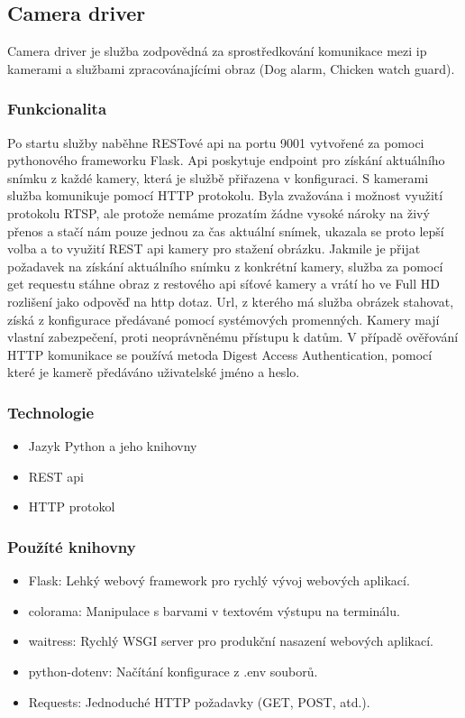 

\subsection{Camera driver}\label{subsec:camera-driver}
Camera driver je služba zodpovědná za sprostředkování komunikace mezi ip kamerami a službami zpracovánajícími obraz (Dog alarm, Chicken watch guard).\newline

\subsubsection{Funkcionalita}
Po startu služby naběhne RESTové api na portu 9001 vytvořené za pomoci pythonového frameworku Flask.
Api poskytuje endpoint pro získání aktuálního snímku z každé kamery, která je službě přiřazena v konfiguraci.
S kamerami služba komunikuje pomocí HTTP protokolu.
Byla zvažována i možnost využití protokolu RTSP, ale protože nemáme prozatím žádne vysoké nároky na živý přenos a stačí nám pouze jednou za čas aktuální snímek, ukazala se proto lepší volba a to využití REST api kamery pro stažení obrázku.
Jakmile je přijat požadavek na získání aktuálního snímku z konkrétní kamery, služba za pomocí get requestu stáhne obraz z restového api síťové kamery a vrátí ho ve Full HD rozlišení jako odpověď na http dotaz.
Url, z kterého má služba obrázek stahovat, získá z konfigurace předávané pomocí systémových promenných.
Kamery mají vlastní zabezpečení, proti neoprávněnému přístupu k datům.
V případě ověřování HTTP komunikace se používá metoda Digest Access Authentication, pomocí které je kamerě předáváno uživatelské jméno a heslo.

\subsubsection{Technologie}
\begin{itemize}
    \item Jazyk Python a jeho knihovny
    \item REST api
    \item HTTP protokol
\end{itemize}

\subsubsection{Použíté knihovny}
\begin{itemize}
    \item Flask: Lehký webový framework pro rychlý vývoj webových aplikací.
    \item colorama: Manipulace s barvami v textovém výstupu na terminálu.
    \item waitress: Rychlý WSGI server pro produkční nasazení webových aplikací.
    \item python-dotenv: Načítání konfigurace z .env souborů.
    \item Requests: Jednoduché HTTP požadavky (GET, POST, atd.).
\end{itemize}

